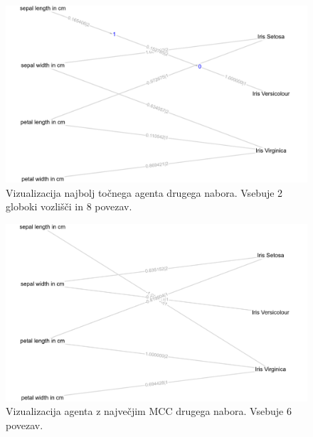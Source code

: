 \begin{figure}[H]
    \begin{center}
        \includegraphics[width=13cm]{iris/2/acc_g}
    \end{center}
    \caption{Vizualizacija najbolj točnega agenta drugega nabora. Vsebuje 2 globoki vozlišči in 8 povezav.}
    \label{fig:iris_acc_2_g}
\end{figure}

\begin{figure}[H]
    \begin{center}
        \includegraphics[width=13cm]{iris/2/mcc_g}
    \end{center}
    \caption{Vizualizacija agenta z največjim MCC drugega nabora. Vsebuje 6 povezav.}
    \label{fig:iris_mcc_2_g}
\end{figure}

